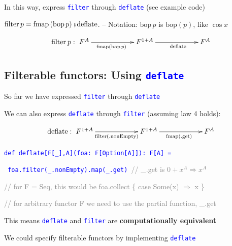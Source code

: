 In this way, express \texttt{\textcolor{blue}{\footnotesize{}filter}}
through \texttt{\textcolor{blue}{\footnotesize{}deflate}} (see example
code)

$\text{filter}\,p=\text{fmap}\left(\text{bop}\,p\right)\bef\text{deflate}$.
– Notation: $\text{bop}\,p$ is $\text{bop}\left(p\right)$, like
$\cos x$

\[
\text{filter}\:p:\xymatrix{\xyScaleX{5pc}F^{A}\ar[r]\sb(0.45){\text{fmap}\left(\text{bop}\,p\right)} & F^{1+A}\ar[r]\sb(0.55){\text{deflate}} & F^{A}}
\]


\subsection{Filterable functors: Using \texttt{\textcolor{blue}{\footnotesize{}deflate}}}

So far we have expressed \texttt{\textcolor{blue}{\footnotesize{}filter}}
through \texttt{\textcolor{blue}{\footnotesize{}deflate}} 

We can also express \texttt{\textcolor{blue}{\footnotesize{}deflate}}
through \texttt{\textcolor{blue}{\footnotesize{}filter}} (assuming
law 4 holds):

\[
\text{deflate}:\xymatrix{\xyScaleX{5pc}F^{1+A}\ar[r]\sb(0.5){\text{filter}\left(\text{.nonEmpty}\right)} & F^{1+A}\ar[r]\sb(0.5){\text{fmap}\left(\text{.get}\right)} & F^{A}}
\]

\texttt{\textcolor{blue}{\footnotesize{}def deflate{[}F{[}\_{]},A{]}(foa: F{[}Option{[}A{]}{]}): F{[}A{]}
=}}{\footnotesize\par}

\texttt{\textcolor{blue}{\footnotesize{}  foa.filter(\_.nonEmpty).map(\_.get)
}}\textcolor{gray}{\footnotesize{}// \_.get is $0+x^{A}\Rightarrow x^{A}$}{\footnotesize\par}

\textcolor{gray}{\footnotesize{}// for F = Seq, this would be foa.collect
\{ case Some(x) $\Rightarrow$ x \}}{\footnotesize\par}

\textcolor{gray}{\footnotesize{}// for arbitrary functor F we need
to use the partial function, \_.get}{\footnotesize\par}

This means \texttt{\textcolor{blue}{\footnotesize{}deflate}} and \texttt{\textcolor{blue}{\footnotesize{}filter}}
are \textbf{computationally equivalent}

We could specify filterable functors by implementing \texttt{\textcolor{blue}{\footnotesize{}deflate}} 

